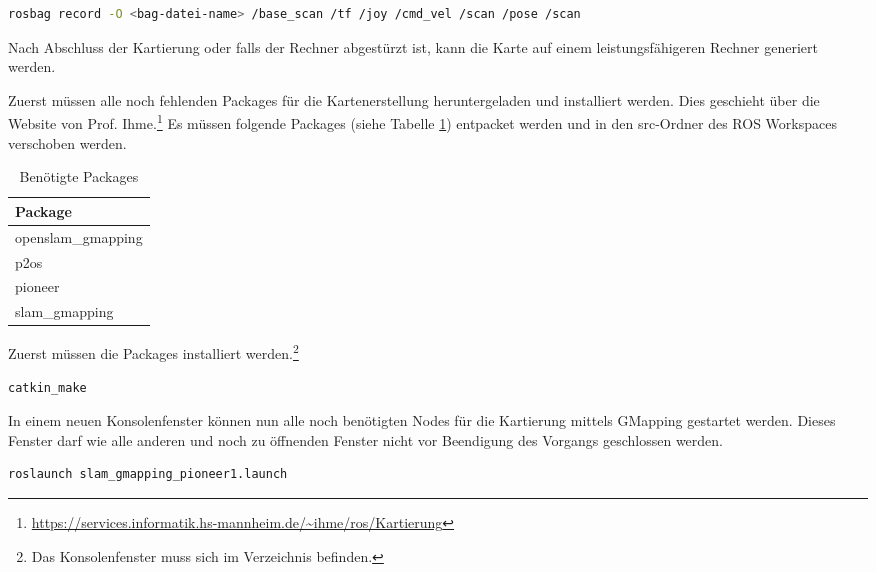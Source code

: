 \begin{lstlisting}[language=sh,caption=Aufnahme aller versendeten Nachrichten]
    rosbag record -O <bag-datei-name> /base_scan /tf /joy /cmd_vel /scan /pose /scan
\end{lstlisting}

Nach Abschluss der Kartierung oder falls der Rechner abgestürzt ist, kann die Karte auf einem leistungsfähigeren Rechner generiert werden.\par

Zuerst müssen alle noch fehlenden Packages für die Kartenerstellung heruntergeladen und installiert werden. Dies geschieht über die Website von Prof. Ihme.\footnote{\url{https://services.informatik.hs-mannheim.de/~ihme/ros/Kartierung}} Es müssen folgende Packages (siehe Tabelle \ref{tab:mapping-packages}) entpacket werden und in den src-Ordner des \ac{ROS} Workspaces verschoben werden.

\begin{table}[H]
  \caption{Benötigte Packages}
  \label{tab:mapping-packages}
  \renewcommand{\arraystretch}{1.2}
  \centering
  \sffamily
  \begin{footnotesize}
    \begin{tabular}{l}
    \toprule
    \textbf{Package}\\
    \midrule
    openslam{\_}gmapping\\
    p2os\\
    pioneer\\
    slam{\_}gmapping\\
    \bottomrule
    \end{tabular}
  \end{footnotesize}
  \rmfamily
\end{table}

Zuerst müssen die Packages installiert werden.\footnote{Das Konsolenfenster muss sich im Verzeichnis  befinden.} 

\begin{lstlisting}[language=sh,caption=Rechte]
    catkin_make
\end{lstlisting}

In einem neuen Konsolenfenster können nun alle noch benötigten Nodes für die Kartierung mittels GMapping gestartet werden. Dieses Fenster darf wie alle anderen und noch zu öffnenden Fenster nicht vor Beendigung des Vorgangs geschlossen werden.

\begin{lstlisting}[language=sh,caption=Rechte]
    roslaunch slam_gmapping_pioneer1.launch
\end{lstlisting}

